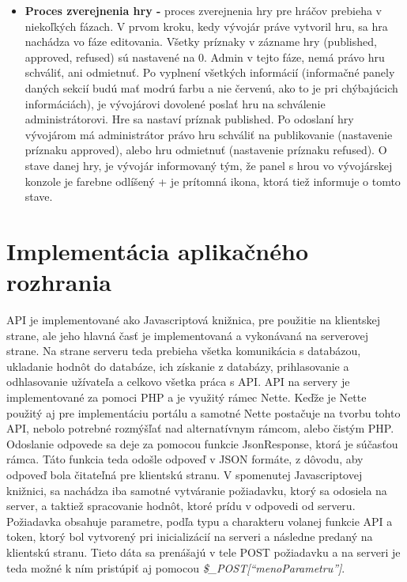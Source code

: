\begin{itemize}
\item \textbf{Proces zverejnenia hry -} proces zverejnenia hry pre hráčov prebieha v niekoľkých fázach. V prvom kroku, kedy vývojár práve vytvoril hru, sa hra nachádza vo fáze editovania. Všetky príznaky v zázname hry (published, approved, refused) sú nastavené na 0. Admin v tejto fáze, nemá právo hru schváliť, ani odmietnuť. Po vyplnení všetkých informácií (informačné panely daných sekcií budú mať modrú farbu a nie červenú, ako to je pri chýbajúcich informáciách), je vývojárovi dovolené poslať hru na schválenie administrátorovi. Hre sa nastaví príznak published. Po odoslaní hry vývojárom má administrátor právo hru schváliť na publikovanie (nastavenie príznaku approved), alebo hru odmietnuť (nastavenie príznaku refused). O stave danej hry, je vývojár informovaný tým, že panel s hrou vo vývojárskej konzole je farebne odlíšený + je prítomná ikona, ktorá tiež informuje o tomto stave. 
\end{itemize} 

\section{Implementácia aplikačného rozhrania}
API je implementované ako Javascriptová knižnica, pre použitie na klientskej strane, ale jeho hlavná časť je implementovaná a vykonávaná na serverovej strane. Na strane serveru teda prebieha všetka komunikácia s databázou, ukladanie hodnôt do databáze, ich získanie z databázy, prihlasovanie a odhlasovanie užívateľa a celkovo všetka práca s API. API na servery je implementované za pomoci PHP a je využitý rámec Nette. Keďže je Nette použitý aj pre implementáciu portálu a samotné Nette postačuje na tvorbu tohto API, nebolo potrebné rozmýšľať nad alternatívnym rámcom, alebo čistým PHP. Odoslanie odpovede sa deje za pomocou funkcie JsonResponse, ktorá je súčasťou rámca. Táto funkcia teda odošle odpoveď v JSON formáte, z dôvodu, aby odpoveď bola čitateľná pre klientskú stranu.  V spomenutej Javascriptovej knižnici, sa nachádza iba samotné vytváranie požiadavku, ktorý sa odosiela na server, a taktiež spracovanie hodnôt, ktoré prídu v odpovedi od serveru. Požiadavka obsahuje parametre, podľa typu a charakteru volanej funkcie API a token, ktorý bol vytvorený pri inicializácií na serveri a následne predaný na klientskú stranu. Tieto dáta sa prenášajú v tele POST požiadavku a na serveri je teda možné k ním pristúpiť aj pomocou \textit{\$\_POST[“menoParametru”]}.  

